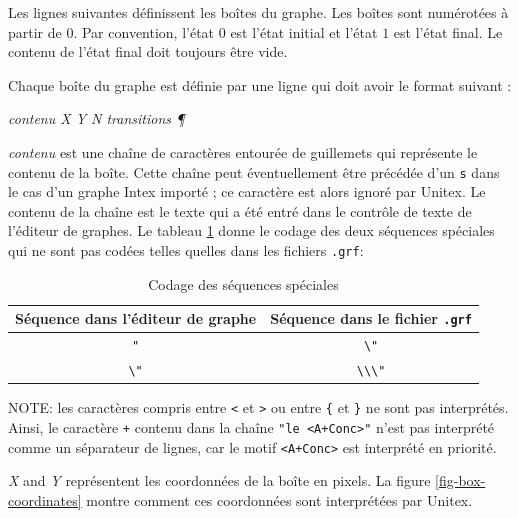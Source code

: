 \bigskip
\noindent Les lignes suivantes définissent les boîtes du graphe. Les boîtes sont numérotées à partir
de $0$. Par convention, l’état $0$ est l’état initial et l’état $1$ est l’état final. Le contenu de
l’état final doit toujours être vide.


\bigskip
\noindent Chaque boîte du graphe est définie par une ligne qui doit avoir le format suivant :

\bigskip
\textit{contenu X Y N transitions \P}

\bigskip
\noindent \textit{contenu} est une chaîne de caractères entourée de guillemets qui représente le contenu de la boîte. Cette chaîne peut éventuellement être précédée d’un \verb+s+                                                                        dans le cas d’un graphe Intex importé ; ce caractère est alors ignoré par Unitex. Le contenu de la chaîne est le texte qui a été entré dans le contrôle de texte de l’éditeur de graphes. Le tableau
\ref{table10-2} donne le codage des deux séquences spéciales qui ne sont pas codées telles quelles dans les fichiers \verb+.grf+:

\bigskip
\begin{table}[h]
\begin{center}
\begin{tabular}{|c|c|}
\hline
Séquence dans l’éditeur de graphe & Séquence dans le fichier \verb+.grf+
\\
\hline
\verb$"$ & \verb$\"$
\\
\hline
\verb$\"$ & \verb$\\\"$
\\
\hline
\end{tabular}
\caption{Codage des séquences spéciales\label{table10-2}}
\end{center}
\end{table}

\bigskip
\noindent NOTE: les caractères compris entre \verb+<+ et \verb+>+ ou entre \verb+{+ et \verb+}+ ne
sont pas interprétés. Ainsi, le caractère \verb$+$ contenu dans la chaîne \verb$"le <A+Conc>"$ n’est
pas interprété comme un séparateur de lignes, car le motif \verb$<A+Conc>$ est interprété en
priorité.

\bigskip
\noindent \textit{X} and \textit{Y} représentent les coordonnées de la boîte en pixels. La figure
\ref{fig-box-coordinates} montre comment ces coordonnées sont interprétées par Unitex.


